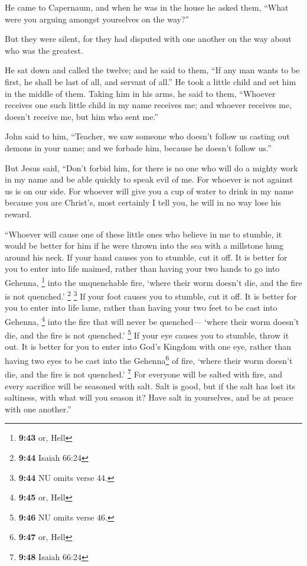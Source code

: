  He came to Capernaum, and when he was in the house he
asked them, ``What were you arguing amongst yourselves on the way?''

 But they were silent, for they had disputed with one
another on the way about who was the greatest.

 He sat down and called the twelve; and he said to them,
``If any man wants to be first, he shall be last of all, and servant of
all.''  He took a little child and set him in the middle
of them. Taking him in his arms, he said to them, 
``Whoever receives one such little child in my name receives me; and
whoever receives me, doesn't receive me, but him who sent me.''

 John said to him, ``Teacher, we saw someone who doesn't
follow us casting out demons in your name; and we forbade him, because
he doesn't follow us.''

 But Jesus said, ``Don't forbid him, for there is no one
who will do a mighty work in my name and be able quickly to speak evil
of me.  For whoever is not against us is on our side.
 For whoever will give you a cup of water to drink in my
name because you are Christ's, most certainly I tell you, he will in no
way lose his reward.

 ``Whoever will cause one of these little ones who
believe in me to stumble, it would be better for him if he were thrown
into the sea with a millstone hung around his neck.  If
your hand causes you to stumble, cut it off. It is better for you to
enter into life maimed, rather than having your two hands to go into
Gehenna, \footnote{\textbf{9:43} or, Hell} into the unquenchable fire,
 `where their worm doesn't die, and the fire is not
quenched.' \footnote{\textbf{9:44} Isaiah 66:24} \footnote{\textbf{9:44}
  NU omits verse 44.}  If your foot causes you to
stumble, cut it off. It is better for you to enter into life lame,
rather than having your two feet to be cast into Gehenna, \footnote{\textbf{9:45}
  or, Hell} into the fire that will never be quenched--- 
`where their worm doesn't die, and the fire is not quenched.'
\footnote{\textbf{9:46} NU omits verse 46.}  If your eye
causes you to stumble, throw it out. It is better for you to enter into
God's Kingdom with one eye, rather than having two eyes to be cast into
the Gehenna\footnote{\textbf{9:47} or, Hell} of fire, 
`where their worm doesn't die, and the fire is not quenched.'
\footnote{\textbf{9:48} Isaiah 66:24}  For everyone will
be salted with fire, and every sacrifice will be seasoned with salt.
 Salt is good, but if the salt has lost its saltiness,
with what will you season it? Have salt in yourselves, and be at peace
with one another.''

